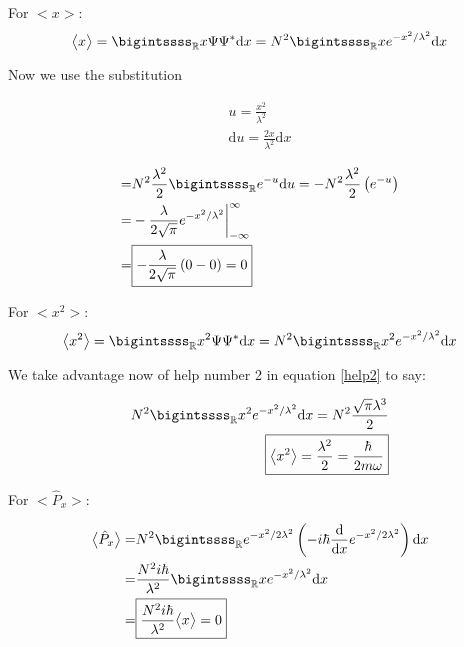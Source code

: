 \documentclass[11pt,letterpaper]{article}%
\newcommand{\dx}{\mathrm{d}x}
\begin{document}
\begin{enumerate}
{For $\big<x\big>$:
\begin{equation}
\label{p3:1}
\big<x\big> = \bigintssss_{\mathbb{R}}x\Psi\Psi^*\dx = N^2\bigintssss_{\mathbb{R}}xe^{-x^2/\lambda^2}\dx
\end{equation}

Now we use the substitution

\begin{equation}
\label{p3:2}
\begin{split}
u = \frac{x^2}{\lambda^2}\\
\mathrm{d}u = \frac{2x}{\lambda^2}\dx
\end{split}
\end{equation}

\begin{equation}
\label{p3:3}
\begin{split}
=& N^2\frac{\lambda^2}{2}\bigintssss_{\mathbb{R}}e^{-u}\mathrm{d}u = -N^2\frac{\lambda^2}{2}\left(e^{-u} \right)\\
=&-\frac{\lambda}{2\sqrt{\pi}}e^{-x^2/\lambda^2}\bigg|_{-\infty}^{\infty}\\
=& \boxed{-\frac{\lambda}{2\sqrt{\pi}}\left( 0 - 0\right) = 0}\\
\end{split}
\end{equation}

For $\big<x^2\big>$:
\begin{equation}
\label{p3:4}
\big<x^2\big> = \bigintssss_{\mathbb{R}}x^2\Psi\Psi^*\dx = N^2\bigintssss_{\mathbb{R}}x^2e^{-x^2/\lambda^2}\dx
\end{equation}

We take advantage now of help number 2 in equation \eqref{help2} to say:

\begin{equation}
\label{p3:5}
\begin{split}
N^2\bigintssss_{\mathbb{R}}x^2e^{-x^2/\lambda^2}\dx = N^2 \frac{\sqrt{\pi}\lambda^3}{2}\\
\boxed{\big<x^2\big> = \frac{\lambda^2}{2} = \frac{\hbar}{2m\omega}}
\end{split}
\end{equation}

For $\big<\hat{P}_x\big>$:

\begin{equation}
\label{p3:6}
\begin{split}
\big<\hat{P}_x\big> =& N^2\bigintssss_{\mathbb{R}}e^{-x^2/2\lambda^2}\left(-i\hbar \frac{\mathrm{d}}{\mathrm{d}x}e^{-x^2/2\lambda^2}\right)\dx\\
=& \frac{N^2i\hbar}{\lambda^2}\bigintssss_{\mathbb{R}}xe^{-x^2/\lambda^2}\dx\\
=& \boxed{\frac{N^2i\hbar}{\lambda^2}\big<x\big> = 0}
\end{split}
\end{equation}

}
\end{enumerate}
\end{document}
